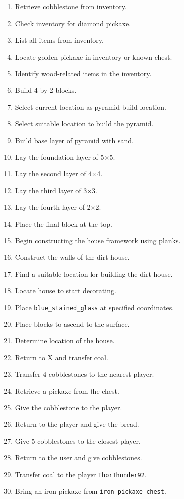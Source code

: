 \begin{small}
\begin{enumerate}
  \item Retrieve cobblestone from inventory.
  \item Check inventory for diamond pickaxe.
  \item List all items from inventory.
  \item Locate golden pickaxe in inventory or known chest.
  \item Identify wood-related items in the inventory.
  \item Build 4 by 2 blocks.
  \item Select current location as pyramid build location.
  \item Select suitable location to build the pyramid.
  \item Build base layer of pyramid with sand.
  \item Lay the foundation layer of 5$\times$5.
  \item Lay the second layer of 4$\times$4.
  \item Lay the third layer of 3$\times$3.
  \item Lay the fourth layer of 2$\times$2.
  \item Place the final block at the top.
  \item Begin constructing the house framework using planks.
  \item Construct the walls of the dirt house.
  \item Find a suitable location for building the dirt house.
  \item Locate house to start decorating.
  \item Place \texttt{blue\_stained\_glass} at specified coordinates.
  \item Place blocks to ascend to the surface.
  \item Determine location of the house.
  \item Return to X and transfer coal.
  \item Transfer 4 cobblestones to the nearest player.
  \item Retrieve a pickaxe from the chest.
  \item Give the cobblestone to the player.
  \item Return to the player and give the bread.
  \item Give 5 cobblestones to the closest player.
  \item Return to the user and give cobblestones.
  \item Transfer coal to the player \texttt{ThorThunder92}.
  \item Bring an iron pickaxe from \texttt{iron\_pickaxe\_chest}.

\end{enumerate}
\end{small}
